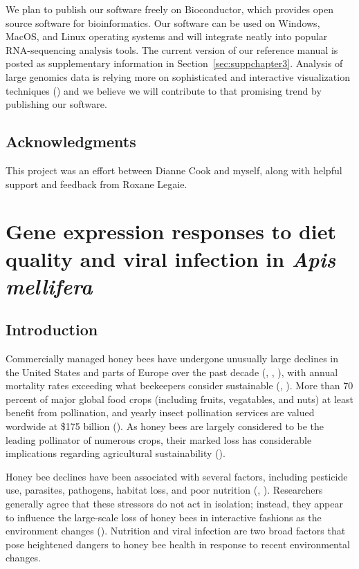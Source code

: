\documentclass[11pt,a4paper,oldfontcommands,openany]{memoir}
\numberwithin{equation}{section} %
\begin{document}
We plan to publish our software freely on Bioconductor, which provides open source software for bioinformatics. Our software can be used on Windows, MacOS, and Linux operating systems and will integrate neatly into popular RNA-sequencing analysis tools. The current version of our reference manual is posted as supplementary information in Section~\ref{sec:suppchapter3}. Analysis of large genomics data is relying more on sophisticated and interactive visualization techniques (\citealt{vizReview}) and we believe we will contribute to that promising trend by publishing our software.

\section{Acknowledgments}

This project was an effort between Dianne Cook and myself, along with helpful support and feedback from Roxane Legaie.


\chapter{Gene expression responses to diet quality and viral infection in \textit{Apis mellifera}}
\label{sec:chapter4}

\section{Introduction}

Commercially managed honey bees have undergone unusually large declines in the United States and parts of Europe over the past decade (\citealt{ccd1}, \citealt{ccd2}, \citealt{ccd3}), with annual mortality rates exceeding what beekeepers consider sustainable (\citealt{ccd5}, \citealt{ccd6}). More than 70 percent of major global food crops (including fruits, vegatables, and nuts) at least benefit from pollination, and yearly insect pollination services are valued wordwide at \$175 billion (\citealt{ccd7}). As honey bees are largely considered to be the leading pollinator of numerous crops, their marked loss has considerable implications regarding agricultural sustainability (\citealt{ccd4}).

Honey bee declines have been associated with several factors, including pesticide use, parasites, pathogens, habitat loss, and poor nutrition (\citealt{factors}, \citealt{factors2}). Researchers generally agree that these stressors do not act in isolation; instead, they appear to influence the large-scale loss of honey bees in interactive fashions as the environment changes (\citealt{interacting}). Nutrition and viral infection are two broad factors that pose heightened dangers to honey bee health in response to recent environmental changes.
\end{document}
